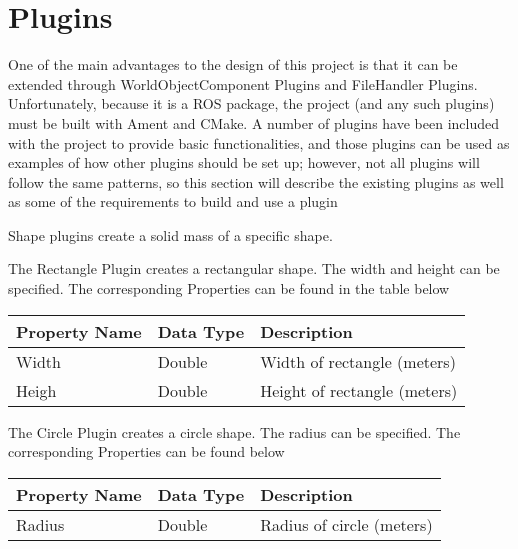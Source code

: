 \documentclass[letterpaper,10pt,english]{sphinxmanual}
\begin{document}
\chapter{Plugins}
\label{\detokenize{index:plugins}}
One of the main advantages to the design of this project is that it can be
extended through WorldObjectComponent Plugins and FileHandler Plugins. Unfortunately,
because it is a ROS package, the project (and any such plugins) must be built with
Ament and CMake. A number of plugins have been included with the project to provide
basic functionalities, and those plugins can be used as examples of how other plugins
should be set up; however, not all plugins will follow the same patterns, so this
section will describe the existing plugins as well as some of the requirements to
build and use a plugin


Shape plugins create a solid mass of a specific shape.


The Rectangle Plugin creates a rectangular shape. The width and height
can be specified. The corresponding Properties can be found in the table below


\begin{savenotes}\sphinxattablestart
\centering
\begin{tabulary}{\linewidth}[t]{|T|T|T|}
\hline
\sphinxstyletheadfamily 
Property Name
&\sphinxstyletheadfamily 
Data Type
&\sphinxstyletheadfamily 
Description
\\
\hline
Width
&
Double
&
Width of rectangle (meters)
\\
\hline
Heigh
&
Double
&
Height of rectangle (meters)
\\
\hline
\end{tabulary}
\par
\sphinxattableend\end{savenotes}


The Circle Plugin creates a circle shape. The radius
can be specified. The corresponding Properties can be found below


\begin{savenotes}\sphinxattablestart
\centering
\begin{tabulary}{\linewidth}[t]{|T|T|T|}
\hline
\sphinxstyletheadfamily 
Property Name
&\sphinxstyletheadfamily 
Data Type
&\sphinxstyletheadfamily 
Description
\\
\hline
Radius
&
Double
&
Radius of circle (meters)
\\
\hline
\end{tabulary}
\par
\sphinxattableend\end{savenotes}
\end{document}
